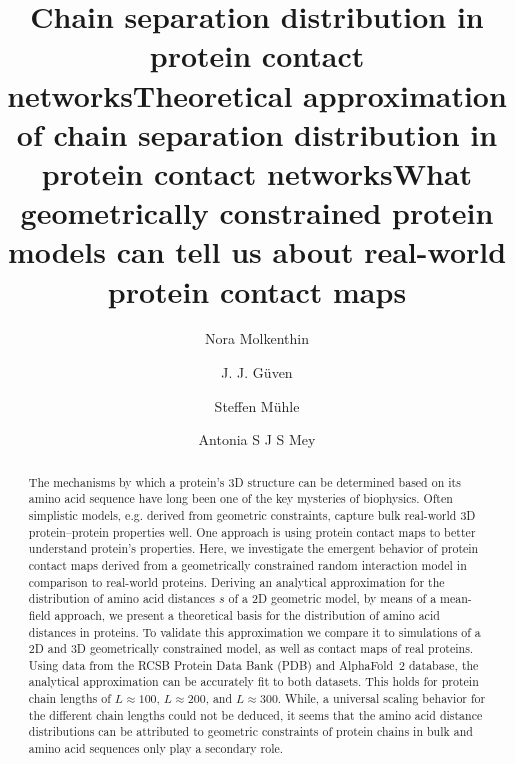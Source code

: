 \documentclass[
reprint,
twocolumn,
amsmath,amssymb,superscriptaddress,aps,
pre]{revtex4-1}
\begin{document}
\title{Chain separation distribution in protein contact networks}
\title{Theoretical approximation of chain separation distribution in protein contact networks}
\title{What geometrically constrained protein models can tell us about real-world protein contact maps}
\author{Nora Molkenthin}
\author{J. J. Güven}
\author{Steffen Mühle}
\author{Antonia S J S Mey}


\begin{abstract}
The mechanisms by which a protein's 3D structure can be determined based on its amino acid sequence have long been one of the key mysteries of biophysics. Often simplistic models, e.g. derived from geometric constraints, capture bulk real-world 3D protein--protein properties well. One approach is using protein contact maps to better understand protein's properties. Here, we investigate the emergent behavior of protein contact maps derived from a geometrically constrained random interaction model in comparison to real-world proteins. Deriving an analytical approximation for the distribution of amino acid distances $s$ of a 2D geometric model, by means of a mean-field approach, we present a theoretical basis for the distribution of amino acid distances in proteins. To validate this approximation we compare it to simulations of a 2D and 3D geometrically constrained model, as well as contact maps of real proteins. Using data from the RCSB Protein Data Bank (PDB) and AlphaFold~2 database, the analytical approximation can be accurately fit to both datasets. This holds for protein chain lengths of $L\approx100$, $L\approx200$, and $L\approx300$. While, a universal scaling behavior for the different chain lengths could not be deduced, it seems that the amino acid distance distributions can be attributed to geometric constraints of protein chains in bulk and amino acid sequences only play a secondary role. 



\end{abstract}
\maketitle
\end{document}
